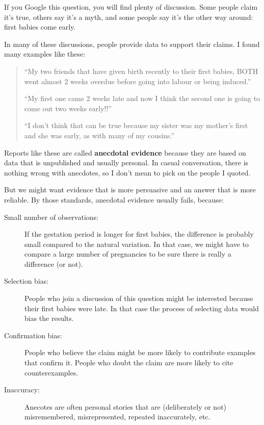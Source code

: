 \documentclass[10pt]{book}
\begin{document}
If you Google this question, you will find plenty of discussion.
Some people claim it's true, others say it's a myth, and some people
say it's the other way around: first babies come early.

In many of these discussions, people provide data to support their
claims.  I found many examples like these:

\begin{quote}

``My two friends that have given birth recently to their first babies,
BOTH went almost 2 weeks overdue before going into labour or being
induced.''

``My first one came 2 weeks late and now I think the second one is
going to come out two weeks early!!''

``I don't think that can be true because my sister was my mother's
first and she was early, as with many of my cousins.''

\end{quote}

Reports like these are called {\bf anecdotal evidence} because they
are based on data that is unpublished and usually personal.  In casual
conversation, there is nothing wrong with anecdotes, so I don't mean
to pick on the people I quoted.

But we might want evidence that is more persuasive and
an answer that is more reliable.  By those standards, anecdotal
evidence usually fails, because:

\begin{description}

\item[Small number of observations:] If the gestation period is longer
  for first babies, the difference is probably small compared to the
  natural variation.  In that case, we might have to compare a large
  number of pregnancies to be sure there is really a difference (or
  not).

\item[Selection bias:] People who join a discussion of this question
  might be interested because their first babies were late.  In that
  case the process of selecting data would bias the results.

\item[Confirmation bias:] People who believe the claim might be more
  likely to contribute examples that confirm it.  People who doubt the
  claim are more likely to cite counterexamples.

\item[Inaccuracy:] Anecotes are often personal stories that are
  (deliberately or not) misremembered, misrepresented, repeated
  inaccurately, etc.

\end{description}
\end{document}

